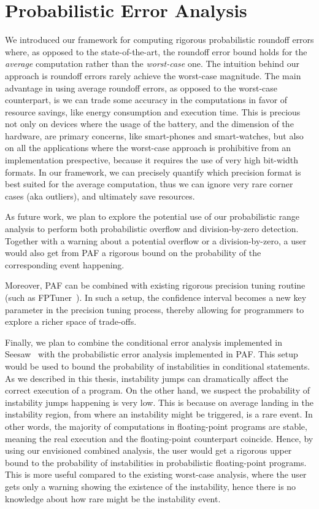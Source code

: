 \section{Probabilistic Error Analysis}
%
We introduced our framework for computing rigorous probabilistic roundoff errors where, as opposed to the state-of-the-art, the roundoff error bound holds for the \emph{average} computation rather than the \emph{worst-case} one.
%
The intuition behind our approach is roundoff errors rarely achieve the worst-case magnitude. 
%
The main advantage in using average roundoff errors, as opposed to the worst-case counterpart, is we can trade some accuracy in the computations in favor of resource savings, like energy consumption and execution time.
%
This is precious not only on devices where the usage of the battery, and the dimension of the hardware, are primary concerns, like smart-phones and smart-watches, but also on all the applications where the worst-case approach is prohibitive from an implementation prespective, because it requires the use of very high bit-width formats. 
%
In our framework, we can precisely quantify which precision format is best suited for the average computation, thus we can ignore very rare corner cases (aka outliers), and ultimately save resources.
%

As future work, we plan to explore the potential use of our probabilistic range analysis to perform both probabilistic overflow and division-by-zero detection.
%
Together with a warning about a potential overflow or a division-by-zero, a user would also get from PAF a rigorous bound on the probability of the corresponding event happening.

Moreover, PAF can be combined with existing rigorous precision tuning routine (such as FPTuner~\cite{fptuner}). 
%
In such a setup, the confidence interval becomes a new key parameter in the precision tuning process, thereby allowing for programmers to explore a richer space of trade-offs.
%

Finally, we plan to combine the conditional error analysis implemented in Seesaw~\cite{seesaw} with the probabilistic error analysis implemented in PAF. 
%
This setup would be used to bound the probability of instabilities in conditional statements.
%
As we described in this thesis, instability jumps can dramatically affect the correct execution of a program.
%
On the other hand, we suspect the probability of instability jumps happening is very low.
%
This is because on average landing in the instability region, from where an instability might be triggered, is a rare event.
%
In other words, the majority of computations in floating-point programs are stable, meaning the real execution and the floating-point counterpart coincide.
% 
Hence, by using our envisioned combined analysis, the user would get a rigorous upper bound to the probability of instabilities in probabilistic floating-point programs.
%
This is more useful compared to the existing worst-case analysis, where the user gets only a warning showing the existence of the instability, hence there is no knowledge about how rare might be the instability event.

\newpage

